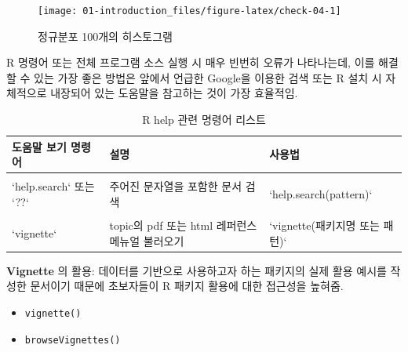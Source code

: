 \documentclass[
  11pt,
]{krantz}
\makeatletter
\providecommand{\tightlist}{%
  \setlength{\itemsep}{0pt}\setlength{\parskip}{0pt}}
\newenvironment{kframe}{%
\medskip{}
\setlength{\fboxsep}{.8em}
 \def\at@end@of@kframe{}%
 \ifinner\ifhmode%
  \def\at@end@of@kframe{\end{minipage}}%
  \begin{minipage}{\columnwidth}%
 \fi\fi%
 \def\FrameCommand##1{\hskip\@totalleftmargin \hskip-\fboxsep
 \colorbox{shadecolor}{##1}\hskip-\fboxsep
     \hskip-\linewidth \hskip-\@totalleftmargin \hskip\columnwidth}%
 \MakeFramed {\advance\hsize-\width
   \@totalleftmargin\z@ \linewidth\hsize
   \@setminipage}}%
 {\par\unskip\endMakeFramed%
 \at@end@of@kframe}
\newenvironment{rmdblock}[1]
  {
  \begin{itemize}
  \renewcommand{\labelitemi}{
    \raisebox{-.7\height}[0pt][0pt]{
      {\setkeys{Gin}{width=3em,keepaspectratio}\texttt{[image: images/\#1]}}
    }
  }
  \setlength{\fboxsep}{1em}
  \begin{kframe}
  \item
  }
  {
  \end{kframe}
  \end{itemize}
  }
\newenvironment{rmdtip}
  {\begin{rmdblock}{tip}}
  {\end{rmdblock}}
\makeatother
\begin{document}
\begin{figure}

{\centering \texttt{[image: 01-introduction\_files/figure-latex/check-04-1]} 

}

\caption{정규분포 100개의 히스토그램}\label{fig:check-04}
\end{figure}

\normalsize

\footnotesize

\begin{rmdtip}
R 명령어 또는 전체 프로그램 소스 실행 시 매우 빈번히 오류가 나타나는데, 이를 해결할 수 있는 가장 좋은 방법은 앞에서 언급한 Google을 이용한 검색 또는 R 설치 시 자체적으로 내장되어 있는 도움말을 참고하는 것이 가장 효율적임.
\end{rmdtip}

\normalsize

\footnotesize

\begin{table}[H]

\caption{\label{tab:tab-help}R help 관련 명령어 리스트}
\centering
\fontsize{10}{12}\selectfont
\begin{tabular}[t]{l>{\raggedright\arraybackslash}p{5cm}l}
\toprule
도움말 보기 명령어 & 설명 & 사용법\\
\midrule
\cellcolor{gray!6}{`help` 또는 `?`} & \cellcolor{gray!6}{도움말 시스템 호출} & \cellcolor{gray!6}{`help(함수명)`}\\
`help.search` 또는 `??` & 주어진 문자열을 포함한 문서 검색 & `help.search(pattern)`\\
\cellcolor{gray!6}{`example`} & \cellcolor{gray!6}{topic의 도움말 페이지에 있는 examples section 실행} & \cellcolor{gray!6}{`example(함수명)`}\\
`vignette` & topic의 pdf 또는 html 레퍼런스 메뉴얼 불러오기 & `vignette(패키지명 또는 패턴)`\\
\bottomrule
\end{tabular}
\end{table}

\normalsize

\footnotesize

\begin{rmdtip}
\textbf{Vignette} 의 활용: 데이터를 기반으로 사용하고자 하는 패키지의 실제 활용 예시를 작성한 문서이기 때문에 초보자들이 R 패키지 활용에 대한 접근성을 높혀줌.

\begin{itemize}
\tightlist
\item
  \texttt{vignette()}
\item
  \texttt{browseVignettes()}
\end{itemize}
\end{rmdtip}
\end{document}
